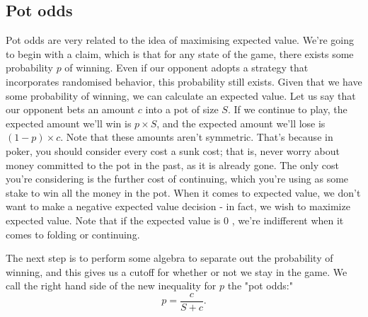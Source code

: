 \documentclass{article}
\begin{document}
\subsection{Pot odds}
Pot odds are very related to the idea of maximising expected value. We're going to begin with a claim, which is that for any state of the game, there exists some probability $p$ of winning. Even if our opponent adopts a strategy that incorporates randomised behavior, this probability still exists. Given that we have some probability of winning, we can calculate an expected value. Let us say that our opponent bets an amount $c$ into a pot of size $S$. If we continue to play, the expected amount we'll win is $p \times S$, and the expected amount we'll lose is $(1-p) \times c$. Note that these amounts aren't symmetric. That's because in poker, you should consider every cost a sunk cost; that is, never worry about money committed to the pot in the past, as it is already gone. The only cost you're considering is the further cost of continuing, which you're using as some stake to win all the money in the pot. When it comes to expected value, we don't want to make a negative expected value decision - in fact, we wish to maximize expected value. Note that if the expected value is 0 , we're indifferent when it comes to folding or continuing.

The next step is to perform some algebra to separate out the probability of winning, and this gives us a cutoff for whether or not we stay in the game. We call the right hand side of the new inequality for $p$ the "pot odds:"
\[p=\frac{c}{S+c}.\]
\end{document}
